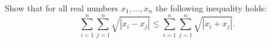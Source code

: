 Show that for all real numbers $x_1,\ldots,x_n$ the following inequality holds:
\[ \sum_{i=1}^{n} \sum_{j=1}^{n} \sqrt{|x_i - x_j|} \leq \sum_{i=1}^{n} \sum_{j=1}^{n} \sqrt{|x_i + x_j|}. \]
